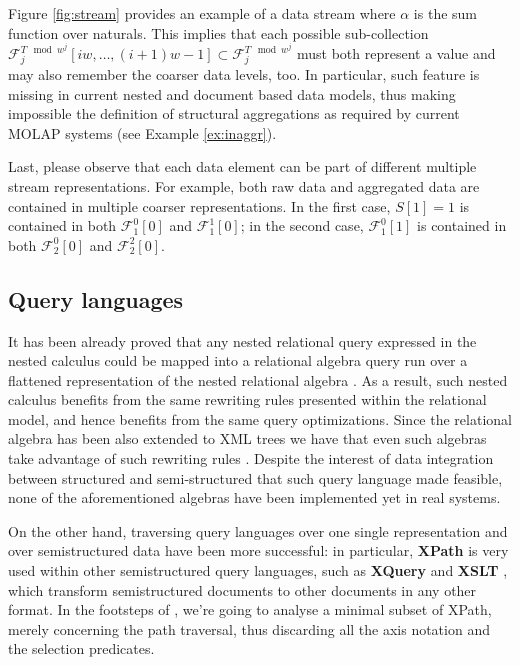 \begin{example}
Figure \ref{fig:stream} provides an example of a data stream where $\alpha$ is the sum function over naturals. This implies that each possible sub-collection $\mathcal{F}_{j}^{T\mod{w^j}}[iw,\dots,(i+1)w-1]\subset \mathcal{F}_{j}^{T\mod{w^j}}$ must both represent a value and may also remember the coarser data levels, too. In particular, such feature is missing in current nested and document based data models, thus making impossible the definition of structural aggregations as required by current MOLAP systems (see Example \vref{ex:inaggr}). 

Last, please observe that each data element can be part of different multiple stream representations. For example, both raw data and aggregated data are contained in multiple coarser representations. In the first case, $S[1]=1$ is contained in both $\mathcal{F}_1^0[0]$ and $\mathcal{F}_1^1[0]$; in the second case, $\mathcal{F}_1^0[1]$ is contained in both $\mathcal{F}_2^0[0]$ and $\mathcal{F}_2^2[0]$.
\end{example}


\subsection{Query languages}
It has been already proved that any nested relational query expressed in the nested calculus could be mapped into a relational algebra query run over a flattened representation of the nested relational algebra  \cite{ParedaensG92}. As a result, such nested calculus benefits from the same rewriting rules presented within the relational model, and hence benefits from the same query optimizations. Since the relational algebra has been also extended to XML trees \cite{Lu2006} we have that even such algebras take advantage of such rewriting rules \cite{Magnani06}. Despite the interest of data integration between structured and semi-structured that such query language made feasible, none of the aforementioned algebras have been implemented yet in real systems.

On the other hand, traversing query languages over one single representation and over semistructured data have been more successful: in particular, \textbf{XPath} \cite{xpath31} is very used within other semistructured query languages, such as \textbf{XQuery} \cite{XQuery} and \textbf{XSLT} \cite{Tidwell}, which transform semistructured documents  to  other documents in any other format. %
In the footsteps of \cite{Magnani06}, we're going to analyse a minimal subset of XPath, merely concerning the path traversal, thus discarding all the axis notation and the selection predicates. 


